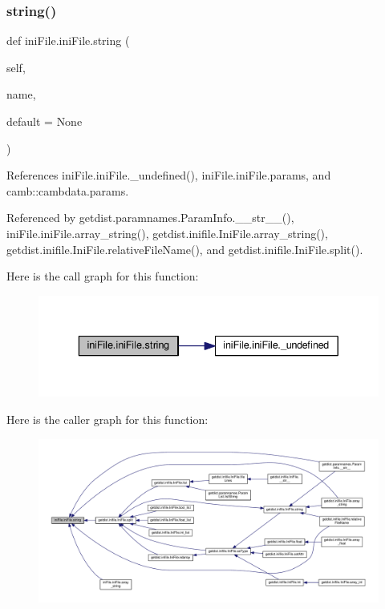 \subsubsection{\texorpdfstring{string()}{string()}}
{\footnotesize\ttfamily def ini\+File.\+ini\+File.\+string (\begin{DoxyParamCaption}\item[{}]{self,  }\item[{}]{name,  }\item[{}]{default = {\ttfamily None} }\end{DoxyParamCaption})}



References ini\+File.\+ini\+File.\+\_\+undefined(), ini\+File.\+ini\+File.\+params, and camb\+::cambdata.\+params.



Referenced by getdist.\+paramnames.\+Param\+Info.\+\_\+\+\_\+str\+\_\+\+\_\+(), ini\+File.\+ini\+File.\+array\+\_\+string(), getdist.\+inifile.\+Ini\+File.\+array\+\_\+string(), getdist.\+inifile.\+Ini\+File.\+relative\+File\+Name(), and getdist.\+inifile.\+Ini\+File.\+split().

Here is the call graph for this function\+:
\nopagebreak
\begin{figure}[H]
\begin{center}
\leavevmode
\includegraphics[width=336pt]{classiniFile_1_1iniFile_a1ecee7d1dc8b4265f09528e0680cffe8_cgraph}
\end{center}
\end{figure}
Here is the caller graph for this function\+:
\nopagebreak
\begin{figure}[H]
\begin{center}
\leavevmode
\includegraphics[width=350pt]{classiniFile_1_1iniFile_a1ecee7d1dc8b4265f09528e0680cffe8_icgraph}
\end{center}
\end{figure}


